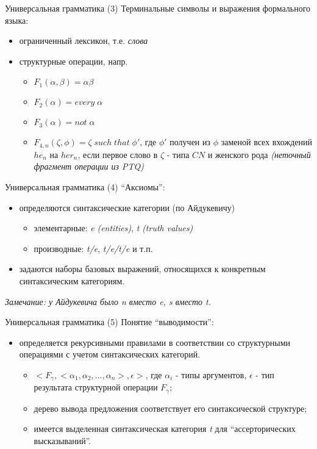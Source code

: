 \documentclass{beamer}
\begin{document}
\begin{frame}{Универсальная грамматика (3)}
Терминальные символы и выражения формального языка:\\
\begin{itemize}
  \item ограниченный лексикон, т.е. \textit{слова}
  \item структурные операции, напр. 
    \begin{itemize}
      \item $F_1(\alpha, \beta) = \alpha \beta$
      \item $F_2(\alpha) = every \; \alpha$
      \item $F_3(\alpha) = not \; \alpha$
      \item $F_{4,n}(\zeta, \phi) = \zeta \; such \; that \; \phi'$, где $\phi'$ получен из $\phi$ заменой всех вхождений $he_n$ на $her_n$, если первое слово в $\zeta$ - типа $CN$ и женского рода \textit{(неточный фрагмент операции из PTQ)}
    \end{itemize}
\end{itemize}
\end{frame}

\begin{frame}{Универсальная грамматика (4)}
``Аксиомы'':\\
\begin{itemize}
  \item определяются синтаксические категории (по Айдукевичу)
    \begin{itemize}
      \item элементарные: \textit{e} \textit{(entities)}, \textit{t} \textit{(truth values)}
      \item производные: \textit{t/e}, \textit{t/e/t/e} и т.п.
    \end{itemize}
  \item задаются наборы базовых выражений, относящихся к конкретным синтаксическим категориям.
\end{itemize}
\bigskip
\textit{Замечание: у Айдукевича было n вместо e, s вместо t.}
\end{frame}

\begin{frame}{Универсальная грамматика (5)}
Понятие ``выводимости'':\\
\begin{itemize}
  \item определяется рекурсивными правилами в соответствии со структурными операциями с учетом синтаксических категорий.
    \begin{itemize}
      \item $< \! F_\gamma, < \! \alpha_1, \alpha_2, ... , \alpha_n \! >, \epsilon \!>$, где $\alpha_i$ - типы аргументов, $\epsilon$ - тип результата структурной операции $F_\gamma$;
      \item дерево вывода предложения соответствует его синтаксической структуре;
      \item имеется выделенная синтаксическая категория \textit{t} для ``ассерторических высказываний''.
    \end{itemize}
\end{itemize}
\end{frame}
\end{document}
